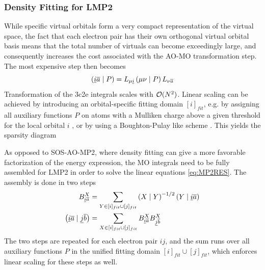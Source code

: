 \subsubsection{Density Fitting for LMP2}

While specific virtual orbitals form a very compact representation of the virtual space, the fact that each electron pair has their own orthogonal virtual orbital basis means that the total number of virtuals can become exceedingly large, and consequently increases the cost associated with the AO-MO transformation step. The most expensive step then becomes
\begin{equation}
\left( \underline{i}\overline{a} \mid P \right) = L_{\mu\underline{i}} \left( \mu\nu \mid P \right) L_{\nu\overline{a}}
\end{equation}
\noindent Transformation of the 3c2e integrals scales with $\mathcal{O}(N^{2})$. Linear scaling can be achieved by introducing an orbital-specific fitting domain $[i]_{fit}$, e.g. by assigning all auxiliary functions $P$ on atoms with a Mulliken charge above a given threshold for the local orbital $i$ \cite{Pin2015}, or by using a Boughton-Pulay like scheme \cite{Wer2015}. This yields the sparsity diagram
\begin{center}
\end{center}
\noindent As opposed to SOS-AO-MP2, where density fitting can give a more favorable factorization of the energy expression, the MO integrals need to be fully assembled for LMP2 in order to solve the linear equations \ref{eq:MP2RES}. The assembly is done in two steps
\begin{align}
B^{X}_{\underline{i}\overline{a}} &= \sum_{Y \in [i]_{fit} \cup [j]_{fit}} \left( X \mid Y \right)^{-1/2} \left( Y \mid \underline{i}\overline{a} \right)
\\
\left( \underline{i}\overline{a} \mid \underline{j}\overline{b} \right) &= \sum_{X \in [i]_{fit} \cup [j]_{fit}} B^{X}_{\underline{i}\overline{a}} B^{X}_{\underline{j}\overline{b}} 
\end{align}
\noindent The two steps are repeated for each electron pair $ij$, and the sum runs over all auxiliary functions $P$ in the unified fitting domain $[i]_{fit} \cup [j]_{fit}$, which enforces linear scaling for these steps as well. 

